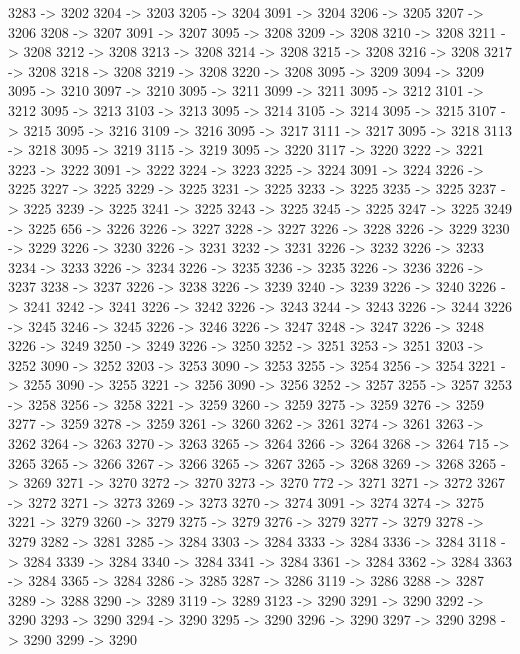 {	3283 -> 3202
	3204 -> 3203
	3205 -> 3204
	3091 -> 3204
	3206 -> 3205
	3207 -> 3206
	3208 -> 3207
	3091 -> 3207
	3095 -> 3208
	3209 -> 3208
	3210 -> 3208
	3211 -> 3208
	3212 -> 3208
	3213 -> 3208
	3214 -> 3208
	3215 -> 3208
	3216 -> 3208
	3217 -> 3208
	3218 -> 3208
	3219 -> 3208
	3220 -> 3208
	3095 -> 3209
	3094 -> 3209
	3095 -> 3210
	3097 -> 3210
	3095 -> 3211
	3099 -> 3211
	3095 -> 3212
	3101 -> 3212
	3095 -> 3213
	3103 -> 3213
	3095 -> 3214
	3105 -> 3214
	3095 -> 3215
	3107 -> 3215
	3095 -> 3216
	3109 -> 3216
	3095 -> 3217
	3111 -> 3217
	3095 -> 3218
	3113 -> 3218
	3095 -> 3219
	3115 -> 3219
	3095 -> 3220
	3117 -> 3220
	3222 -> 3221
	3223 -> 3222
	3091 -> 3222
	3224 -> 3223
	3225 -> 3224
	3091 -> 3224
	3226 -> 3225
	3227 -> 3225
	3229 -> 3225
	3231 -> 3225
	3233 -> 3225
	3235 -> 3225
	3237 -> 3225
	3239 -> 3225
	3241 -> 3225
	3243 -> 3225
	3245 -> 3225
	3247 -> 3225
	3249 -> 3225
	656 -> 3226
	3226 -> 3227
	3228 -> 3227
	3226 -> 3228
	3226 -> 3229
	3230 -> 3229
	3226 -> 3230
	3226 -> 3231
	3232 -> 3231
	3226 -> 3232
	3226 -> 3233
	3234 -> 3233
	3226 -> 3234
	3226 -> 3235
	3236 -> 3235
	3226 -> 3236
	3226 -> 3237
	3238 -> 3237
	3226 -> 3238
	3226 -> 3239
	3240 -> 3239
	3226 -> 3240
	3226 -> 3241
	3242 -> 3241
	3226 -> 3242
	3226 -> 3243
	3244 -> 3243
	3226 -> 3244
	3226 -> 3245
	3246 -> 3245
	3226 -> 3246
	3226 -> 3247
	3248 -> 3247
	3226 -> 3248
	3226 -> 3249
	3250 -> 3249
	3226 -> 3250
	3252 -> 3251
	3253 -> 3251
	3203 -> 3252
	3090 -> 3252
	3203 -> 3253
	3090 -> 3253
	3255 -> 3254
	3256 -> 3254
	3221 -> 3255
	3090 -> 3255
	3221 -> 3256
	3090 -> 3256
	3252 -> 3257
	3255 -> 3257
	3253 -> 3258
	3256 -> 3258
	3221 -> 3259
	3260 -> 3259
	3275 -> 3259
	3276 -> 3259
	3277 -> 3259
	3278 -> 3259
	3261 -> 3260
	3262 -> 3261
	3274 -> 3261
	3263 -> 3262
	3264 -> 3263
	3270 -> 3263
	3265 -> 3264
	3266 -> 3264
	3268 -> 3264
	715 -> 3265
	3265 -> 3266
	3267 -> 3266
	3265 -> 3267
	3265 -> 3268
	3269 -> 3268
	3265 -> 3269
	3271 -> 3270
	3272 -> 3270
	3273 -> 3270
	772 -> 3271
	3271 -> 3272
	3267 -> 3272
	3271 -> 3273
	3269 -> 3273
	3270 -> 3274
	3091 -> 3274
	3274 -> 3275
	3221 -> 3279
	3260 -> 3279
	3275 -> 3279
	3276 -> 3279
	3277 -> 3279
	3278 -> 3279
	3282 -> 3281
	3285 -> 3284
	3303 -> 3284
	3333 -> 3284
	3336 -> 3284
	3118 -> 3284
	3339 -> 3284
	3340 -> 3284
	3341 -> 3284
	3361 -> 3284
	3362 -> 3284
	3363 -> 3284
	3365 -> 3284
	3286 -> 3285
	3287 -> 3286
	3119 -> 3286
	3288 -> 3287
	3289 -> 3288
	3290 -> 3289
	3119 -> 3289
	3123 -> 3290
	3291 -> 3290
	3292 -> 3290
	3293 -> 3290
	3294 -> 3290
	3295 -> 3290
	3296 -> 3290
	3297 -> 3290
	3298 -> 3290
	3299 -> 3290
}
